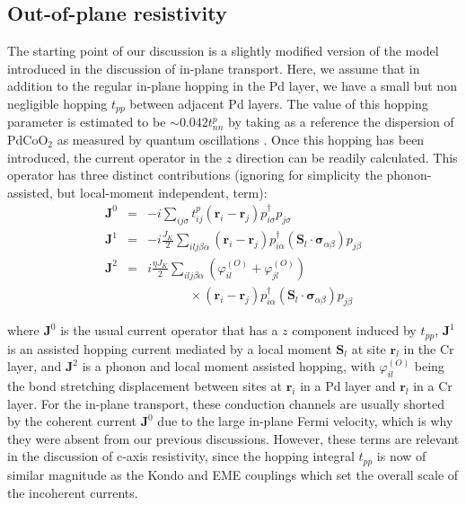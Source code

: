 \documentclass[aps,prl,twocolumn,superscriptaddress,amsmath,nofootinbib,10pt,floatfix]{revtex4-2}
\def \beq {\begin{eqnarray}}
\def \eeq {\end{eqnarray}}
\def \nn {\nonumber}
\begin{document}
\begin{widetext}
\section{Out-of-plane resistivity} \label{appendix_caxis}


The starting point of our discussion is a slightly modified version of the model introduced in the discussion of in-plane transport. Here, we assume that in addition to the regular in-plane hopping in the Pd layer, we have a small but non negligible hopping $t_{pp}$ between adjacent Pd layers. The value of this hopping parameter is estimated to be $\sim 0.042 t^p_{nn}$ by taking as a reference the dispersion of PdCoO$_2$ as measured by quantum oscillations \cite{Hicks_mobility_2012}. Once this hopping has been introduced, the current operator in the $z$ direction can be readily calculated. This operator has three distinct contributions (ignoring for simplicity the phonon-assisted, but local-moment independent, term): 
\beq
\bm{J}^{0}&=&-i\sum_{ij\sigma}t^{p}_{ij}\left(\bm{r}_{i}-\bm{r}_{j}\right)p_{i\sigma}^{\dagger}p_{j\sigma}\\
\bm{J}^{1}&=&-i\frac{J_K}{2}\sum_{ilj\beta\alpha}\left(\bm{r}_{i}-\bm{r}_{j}\right)p_{i\alpha}^{\dagger}\left(\bm{S}_{l}\cdot\bm{\sigma}_{\alpha\beta}\right)p_{j\beta}\\
\bm{J}^{2}&=&i\frac{\eta J_K}{2}\sum_{ilj\beta\alpha}\left(\varphi^{(O)}_{il}+\varphi_{jl}^{(O)}\right)\nn \\ 
& &\,\,\,\,\,\,\,\,\,\,\,\,\,\,\,\,\,\,\,\, \times\left(\bm{r}_{i}-\bm{r}_{j}\right) 
 p_{i\alpha}^{\dagger}\left(\bm{S}_{l}\cdot\bm{\sigma}_{\alpha\beta}\right)p_{j\beta}
 \label{eqn:currents_caxis}
\eeq

where $\bm{J}^{0}$ is the usual current operator that has a $z$ component induced by $t_{pp}$, $\bm{J}^{1}$ is an assisted hopping current mediated by a local moment $\bm{S}_l$ at site $\bm{r}_l$ in the Cr layer, and $\bm{J}^{2}$ is a phonon and local moment assisted hopping, with $\varphi^{(O)}_{il}$ being the bond stretching displacement between sites at $\bm{r}_i$ in a Pd layer and $\bm{r}_l$ in a Cr layer. 
For the in-plane transport, these conduction channels are usually shorted by the coherent current $\bm{J}^{0}$ due to the large in-plane Fermi velocity, which is why they were absent from our previous discussions. However, these terms are relevant in the discussion of c-axis resistivity, since the hopping integral $t_{pp}$ is now of similar magnitude as the Kondo and EME couplings which set the overall scale of the incoherent currents.  




\end{widetext}
\end{document}

